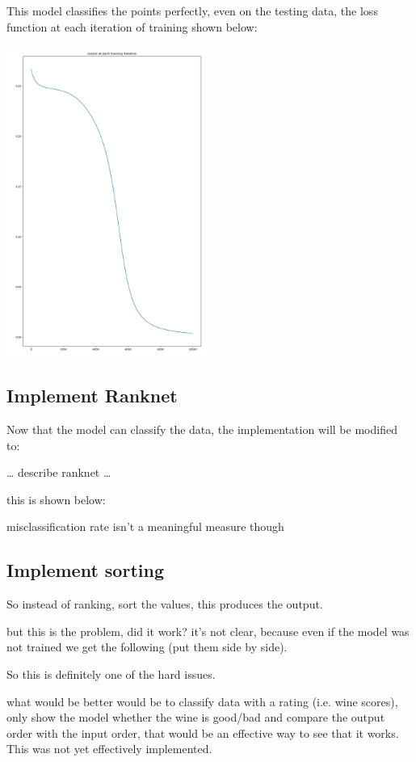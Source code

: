 \documentclass[a4paper,11pt,twoside]{article}
\begin{document}
This model classifies the points perfectly, even on the testing
data, the loss function at each iteration of training shown below:

\begin{center}
\includegraphics[width=0.5\textwidth]{./media/loss_function_initial_nn.png}
\end{center}


\subsection{Implement Ranknet}
\label{sec:orgfebc16b}
Now that the model can classify the data, the implementation will
be modified to:

\ldots{} describe ranknet \ldots{}

this is shown below:

misclassification rate isn't a meaningful measure though


\subsection{Implement sorting}
\label{sec:org70bc22c}
So instead of ranking, sort the values, this produces the output.

but this is the problem, did it work? it's not clear, because even
if the model was not trained we get the following (put them side by side).

So this is definitely one of the hard issues.

what would be better would be to classify data with a rating
(i.e. wine scores), only show the model whether the wine is
good/bad and compare the output order with the input order, that
would be an effective way to see that it works. This was not yet
effectively implemented.
\end{document}
